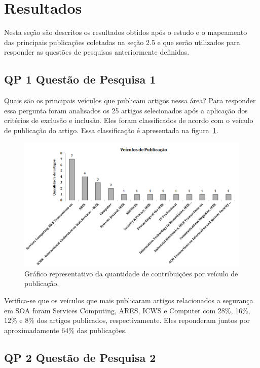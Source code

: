 \section{Resultados}
Nesta seção são descritos os resultados obtidos após o estudo e o mapeamento das principais publicações coletadas na seção 2.5 e que serão utilizados para responder as questões de pesquisas anteriormente definidas.

\subsection{QP 1 \- Questão de Pesquisa 1}

Quais são os principais veículos que publicam artigos nessa área?
Para responder essa pergunta foram analisados os 25 artigos selecionados após a aplicação dos critérios de exclusão e inclusão. Eles foram classificados de acordo com o veículo de publicação do artigo. Essa classificação é apresentada na figura~\ref{fig:grafico_qtd_veiculo}.

\begin{figure}[!htb]
\centering
\includegraphics[scale=0.7]{qtd_veiculo_publicacao.png}
\caption{Gráfico representativo da quantidade de contribuições por veículo de publicação.}
\label{fig:grafico_qtd_veiculo}
\end{figure}

Verifica-se que os veículos que mais publicaram artigos relacionados a segurança em SOA foram Services Computing, ARES, ICWS e Computer com 28\%, 16\%, 12\% e 8\% dos artigos publicados, respectivamente. Eles reponderam juntos por aproximadamente 64\% das publicações.

\subsection{QP 2 \- Questão de Pesquisa 2}

